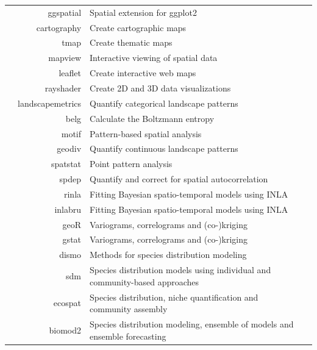 \documentclass[smallextended]{svjour3}       %
\begin{document}
\begin{table}
\begin{tabularx}{1.35\linewidth}{lrXr}
& ggspatial & Spatial extension for ggplot2 & \cite{Dunnington2020} \\
& cartography & Create cartographic maps & \cite{Giraud2016} \\
& tmap & Create thematic maps & \cite{Tennekes2018} \\
& mapview & Interactive viewing of spatial data & \cite{Appelhans2020} \\
& leaflet & Create interactive web maps & \cite{Cheng2021} \\
& rayshader & Create 2D and 3D data visualizations & \cite{Morgen-Wall2020} \\
\hline
{} & landscapemetrics & Quantify categorical landscape patterns & \cite{Hesselbarth2019} \\
& belg & Calculate the Boltzmann entropy & \cite{Nowosad2020} \\
& motif & Pattern-based spatial analysis & \cite{Nowosad2021} \\
& geodiv & Quantify continuous landscape patterns & \cite{Smith2020} \\
\hline
{} & spatstat & Point pattern analysis & \cite{Baddeley2005} \\
& spdep & Quantify and correct for spatial autocorrelation & \cite{Bivand2013} \\
& rinla & Fitting Bayesian spatio-temporal models using INLA & \cite{Rue2009} \\
& inlabru & Fitting Bayesian spatio-temporal models using INLA & \cite{Bachl2019} \\
& geoR & Variograms, correlograms and (co-)kriging & \cite{Diggle2007} \\
& gstat & Variograms, correlograms and (co-)kriging & \cite{Pebesma2004} \\
\hline
{} & dismo & Methods for species distribution modeling & \cite{Hijmans2017} \\
& sdm & Species distribution models using individual and community-based approaches & \cite{Naimi2016} \\
& ecospat & Species distribution, niche quantification and community assembly & \cite{Broennimann2020} \\
& biomod2 & Species distribution modeling, ensemble of models and ensemble forecasting & \cite{Thuiller2020} \\

\end{tabularx}
\end{table}
\end{document}
